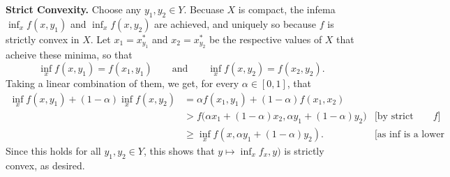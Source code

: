
\textbf{Strict Convexity.}
Choose any $y_1, y_2 \in Y$. 
Becuase $X$ is compact, the infema $\inf_x f(x, y_1)$ and $\inf_x f(x, y_2)$ are achieved, and uniquely so because $f$ is strictly convex in $X$. Let $x_1 = x^*_{y_1}$ and $x_2 = x^*_{y_2}$ be the respective values of $X$ that acheive these minima, so that
\[ \inf_x f(x,y_1) = f(x_1, y_1) \qquad\text{and}\qquad \inf_x f(x,y_2) = f(x_2, y_2) .\]
Taking a linear combination of them, we get, for every $\alpha \in [0,1]$, that
\begin{align*}
    \inf_x f(x,y_1)+ (1-\alpha) \inf_x f(x,y_2) &= \alpha f(x_1,y_1) + (1-\alpha) f(x_1, x_2) & \\
    &> f\Big(\alpha  x_1 + (1-\alpha) x_2 , \alpha  y_1 + (1-\alpha) y_2 \Big)  & \text{[by strict convexity of $f$]}\\
    &\ge \inf_x f(x, \alpha  y_1 + (1-\alpha) y_2). & \text{[as $\inf$ is a lower bound]}
\end{align*}
Since this holds for all $y_1, y_2 \in Y$, this shows that $y \mapsto \inf_x f_x,y)$ is strictly convex, as desired.
